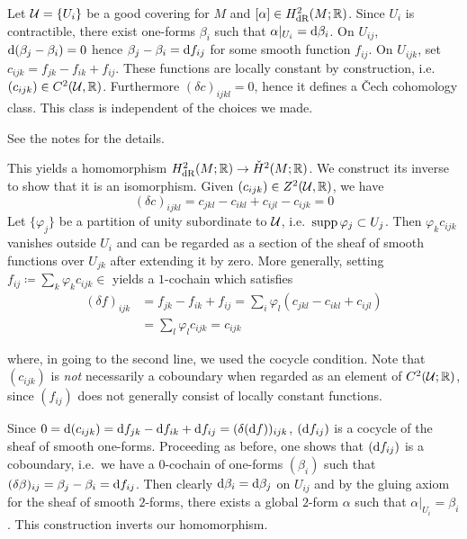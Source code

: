 \documentclass[parskip=half]{scrartcl}
\begin{document}
\begin{myproof}
	\begin{onboard}
	Let $\mathcal{U}=\{U_i\}$ be a good covering for $M$ and $[\alpha]\in H^2_\text{dR}(M;\mathbb{R})$. Since $U_i$ is contractible, there exist one-forms $\beta_i$ such that $\alpha|_{U_i}=\mathrm{d} \beta_i$. On $U_{ij}$, $\mathrm{d}(\beta_j-\beta_i)=0$ hence $\beta_j-\beta_i=\mathrm{d} f_{ij}$ for some smooth function $f_{ij}$. On $U_{ijk}$, set $c_{ijk}=f_{jk}-f_{ik}+f_{ij}$. These functions are locally constant by construction, i.e.~$(c_{ijk})\in C^2(\mathcal{U},\mathbb{R})$. Furthermore $(\delta c)_{ijkl}=0$, hence it defines a \v{C}ech cohomology class. This class is independent of the choices we made. 
	\end{onboard}
	See the notes for the details. 
	
	\begin{onboard}
	This yields a homomorphism $H^2_\text{dR}(M;\mathbb{R})\to \check H^2(M;\mathbb{R})$. We construct its inverse to show that it is an isomorphism. Given $(c_{ijk})\in Z^2(\mathcal{U},\mathbb{R})$, we have
	\begin{equation*}
		(\delta c)_{ijkl}=c_{jkl}-c_{ikl}+c_{ijl}-c_{ijk}=0
	\end{equation*}
	Let $\{\varphi_j\}$ be a partition of unity subordinate to $\mathcal{U}$, i.e.~$\operatorname{supp} \varphi_j\subset U_j$. Then $\varphi_k c_{ijk}$ vanishes outside $U_i$ and can be regarded as a section of the sheaf of smooth functions over $U_{jk}$ after extending it by zero. More generally, setting $f_{ij}\coloneqq \sum_k \varphi_k c_{ijk}\in $ yields a $1$-cochain which satisfies
	\begin{align*}
		(\delta f)_{ijk}&=f_{jk}-f_{ik}+f_{ij}=\sum_i \varphi_l(c_{jkl}-c_{ikl} + c_{ijl})\\
		&=\sum_l \varphi_l c_{ijk}=c_{ijk}
	\end{align*}
	\end{onboard}
	where, in going to the second line, we used the cocycle condition. Note that $(c_{ijk})$ is \emph{not} necessarily a coboundary when regarded as an element of $C^2(\mathcal{U};\mathbb{R})$, since $(f_{ij})$ does not generally consist of locally constant functions.
	
	\begin{onboard}
	Since $0=\mathrm{d} (c_{ijk})=\mathrm{d} f_{jk}-\mathrm{d} f_{ik}+ \mathrm{d} f_{ij}=(\delta (\mathrm{d} f))_{ijk}$, $(\mathrm{d} f_{ij})$ is a cocycle of the sheaf of smooth one-forms. Proceeding as before, one shows that $(\mathrm{d} f_{ij})$ is a coboundary, i.e.~we have a $0$-cochain of one-forms $(\beta_i)$ such that $(\delta \beta)_{ij}=\beta_j-\beta_i=\mathrm{d} f_{ij}$. Then clearly $\mathrm{d} \beta_i=\mathrm{d}\beta_j$ on $U_{ij}$ and by the gluing axiom for the sheaf of smooth $2$-forms, there exists a global $2$-form $\alpha$ such that $\alpha|_{U_i}=\beta_i$. This construction inverts our homomorphism.
	\end{onboard}
\end{myproof}
\end{document}
